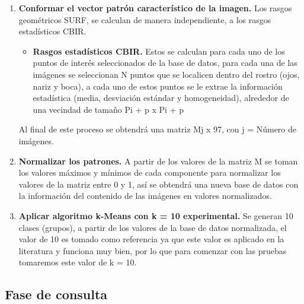 \begin{enumerate}
\begin{enumerate}
		\item \textbf{Extracci\'on de los rasgos estad\'isticos.} Los rasgos estad\'isticos son generados para cada uno de los puntos de inter\'es, de cada una de las capas del espacio de color HSI. A partir de un punto de inter\'es determinado en un pixel se genera una ventana p de tama\~no {Pi + p x Pi + p} p\'ixeles con el punto de inter\'es en el centro, dentro de esta ventana (vecindad) se extraer\'an tres valores de informaci\'on estad\'istica: media, desviaci\'on est\'andar y homogeneidad, por lo que al final obtendremos N puntos de inter\'es, 3 valores estad\'isticos para cada vecindad del punto de inter\'es y 3 capas por imagen, tendremos {N x 3 x 3} valores estad\'isticos de la imagen en cuesti\'on.
	\end{enumerate}
	\item \textbf{Conformar el vector patr\'on caracter\'istico de la imagen.} Los rasgos geom\'etricos SURF, se calculan de manera independiente, a los rasgos estad\'isticos CBIR.
		\begin{itemize}
			\item \textbf{Rasgos estad\'isticos CBIR.} Estos se calculan para cada uno de los puntos de inter\'es seleccionados de la base de datos, para cada una de las im\'agenes se seleccionan N puntos que se localicen dentro del rostro (ojos, nariz y boca), a cada uno de estos puntos se le extrae la informaci\'on estad\'istica (media, desviaci\'on est\'andar y homogeneidad), alrededor de una vecindad de tama\~no {Pi + p x Pi + p}
		\end{itemize}
		Al final de este proceso se obtendr\'a una matriz {Mj x 97}, con j = N\'umero de im\'agenes.
	\item \textbf{Normalizar los patrones.} A partir de los valores de la matriz M se toman los valores m\'aximos y m\'inimos de cada componente para normalizar los valores de la matriz entre 0 y 1, as\'i se obtendr\'a una nueva base de datos con la informaci\'on del contenido de las im\'agenes en valores normalizados.
	\item \textbf{Aplicar algoritmo k-Means con k = 10 experimental.} Se generan 10 clases (grupos), a partir de los valores de la base de datos normalizada, el valor de 10 es tomado como referencia ya que este valor es aplicado en la literatura y funciona muy bien, por lo que para comenzar con las pruebas tomaremos este valor de k = 10.
\end{enumerate}

\subsection{Fase de consulta}

